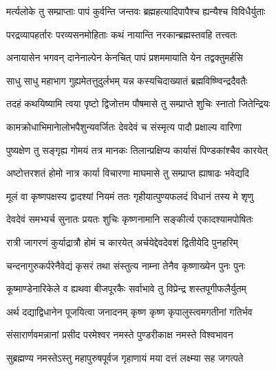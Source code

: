 \hyperref[sec:ekadashi_mahatmyam_vrata_raja]{\closesub}
\clearpage

\label{sec:vrata-raja-magha-krishna-shattila}


\twolineshloka
{मर्त्यलोके तु सम्प्राप्ताः पापं कुर्वन्ति जन्तवः}
{ब्रह्महत्यादिपापैश्च ह्यन्यैश्च विविधैर्युताः} %

\twolineshloka
{परद्रव्यापहर्तारः परव्यसनमोहिताः}
{कथं नायान्ति नरकान्ब्रह्मस्तवहि तत्त्वतः} %

\twolineshloka
{अनायासेन भगवन् दानेनाल्पेन केनचित्}
{पापं प्रशममायाति येन तद्वक्तुमर्हसि} %


\twolineshloka
{साधु साधु महाभाग गुह्यमेतत्तुदुर्लभम्}
{यन्न कस्यचिदाख्यातं ब्रह्मविष्ण्विन्द्रदैवतैः} %

\twolineshloka
{तदहं कथयिष्यामि त्वया पृष्टो द्विजोत्तम}
{पौषमासे तु सम्प्राप्ते शुचिः स्नातो जितेन्द्रियः} %

\twolineshloka
{कामक्रोधाभिमानेालोभपैशुन्यवर्जितः}
{देवदेवं च संस्मृत्य पादौ प्रक्षाल्य वारिणा} %

\twolineshloka
{पुष्यक्षेण तु सङ्गृह्य गोमयं तत्र मानकः}
{तिलान्प्रक्षिप्य कार्यासं पिण्डकांश्चैव कारयेत्} %

\twolineshloka
{अष्टोत्तरशतं होमो नात्र कार्या विचारणा}
{माघमासे तु सम्प्राप्त ह्याषाढः भवेद्यदि} %

\twolineshloka
{मूलं वा कृष्णपक्षस्य द्वादश्यां नियमं ततः}
{गृहीयात्पुण्यफलदं विधानं तस्य मे शृणु} %

\twolineshloka
{देवदेवं समभ्यर्च सुनातः प्रयतः शुचिः}
{कृष्णनामानि सङ्कीर्त्य एकादश्यामपोषितः} %

\twolineshloka
{रात्री जागरणं कुर्याद्रात्रौ होमं च कारयेत्}
{अर्चयेद्देवदेवशं द्वितीयेदि पुनहरिम्} %

\twolineshloka
{चन्दनागुरुकर्परेनैवेद्यं कृसरं तथा}
{संस्तुत्य नाम्ना तेनैव कृष्णाख्येन पुनः पुनः} %

\twolineshloka
{कूष्माण्डेनारिकेले व ह्यथवा बीजपूरकैः}
{सर्वाभावे तु विप्रेन्द्र शस्तपूगीफलैर्युतम्} %

\twolineshloka
{अर्थ दद्याद्विधानेन पूजयित्वा जनादनम्}
{कृष्ण कृष्ण कृपालुस्त्वमगतीनां गतिर्भव} %

\twolineshloka
{संसारार्णवमन्नानां प्रसीद परमेश्वर}
{नमस्ते पुण्डरीकाक्ष नमस्ते विश्वभावन} %

\twolineshloka
{सुब्रह्मण्य नमस्तेऽस्तु महापुरुषपूर्वज}
{गृहाणायं मया दत्तं लक्ष्म्या सह जगत्पते} %

